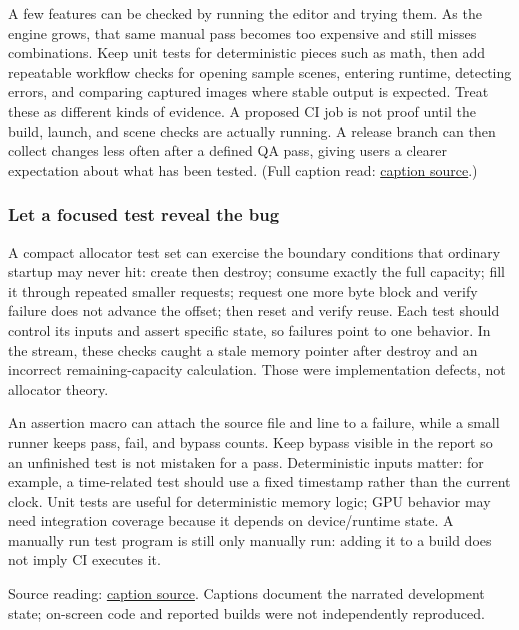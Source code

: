 \hypertarget{06-engine-ii-ch041-grow-the-quality-process-with-the-project}{}

A few features can be checked by running the editor and trying them. As the engine grows, that same manual pass becomes too expensive and still misses combinations. Keep unit tests for deterministic pieces such as math, then add repeatable workflow checks for opening sample scenes, entering runtime, detecting errors, and comparing captured images where stable output is expected. Treat these as different kinds of evidence. A proposed CI job is not proof until the build, launch, and scene checks are actually running. A release branch can then collect changes less often after a defined QA pass, giving users a clearer expectation about what has been tested. (Full caption read: \href{https://www.youtube.com/watch?v=tHjJHmDxhug}{caption source}.)

\subsubsection{Let a focused test reveal the bug}\label{06-engine-ii-ch041-let-a-focused-test-reveal-the-bug}

\hypertarget{06-engine-ii-ch041-let-a-focused-test-reveal-the-bug}{}

A compact allocator test set can exercise the boundary conditions that ordinary startup may never hit: create then destroy; consume exactly the full capacity; fill it through repeated smaller requests; request one more byte block and verify failure does not advance the offset; then reset and verify reuse. Each test should control its inputs and assert specific state, so failures point to one behavior. In the stream, these checks caught a stale memory pointer after destroy and an incorrect remaining-capacity calculation. Those were implementation defects, not allocator theory.

An assertion macro can attach the source file and line to a failure, while a small runner keeps pass, fail, and bypass counts. Keep bypass visible in the report so an unfinished test is not mistaken for a pass. Deterministic inputs matter: for example, a time-related test should use a fixed timestamp rather than the current clock. Unit tests are useful for deterministic memory logic; GPU behavior may need integration coverage because it depends on device/runtime state. A manually run test program is still only manually run: adding it to a build does not imply CI executes it.

Source reading: \href{https://www.youtube.com/watch?v=3ZFcvBjRFN0}{caption source}. Captions document the narrated development state; on-screen code and reported builds were not independently reproduced.

